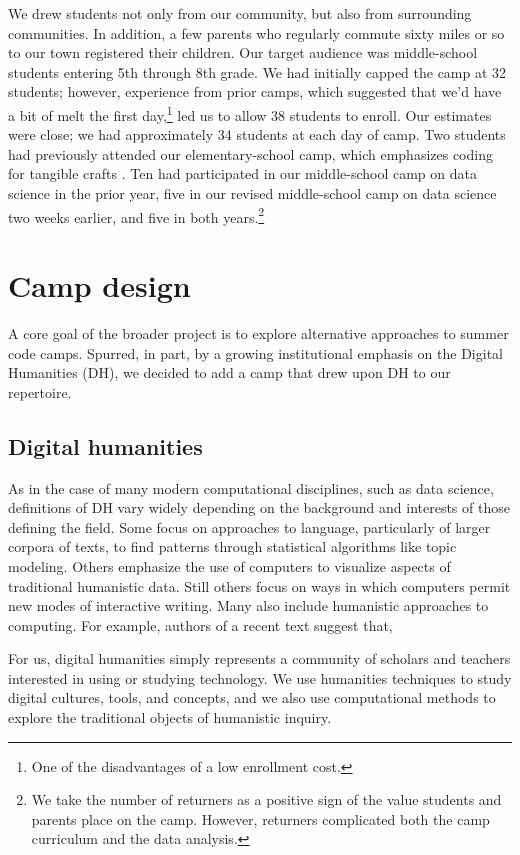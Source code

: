We drew students not only from our community, but also from
surrounding communities.  In addition, a few parents who regularly
commute sixty miles or so to our town registered their children.  Our
target audience was middle-school students entering 5th through 8th grade.
We had initially capped the camp at 32 students; however, experience
from prior camps, which suggested that we'd have a bit of melt the
first day,\footnote{One of the disadvantages of a low enrollment cost.}
led us to allow 38 students to enroll.  Our estimates were close;
we had approximately 34 students at each day of camp.  Two students
had previously attended our elementary-school camp, which emphasizes
coding for tangible crafts \cite{craft-of-code}.  Ten had participated in 
our middle-school camp on data science \cite{dssg-sigcse-2018} in the prior year, five in
our revised middle-school camp on data science \cite{dssg-sigcse-2019} two weeks earlier, and five
in both years.\footnote{We take the number of returners
as a positive sign of the value students and parents place on the camp.
However, returners complicated both the camp curriculum and the
data analysis.}  

\section{Camp design}

A core goal of the broader project is to explore alternative approaches
to summer code camps.  Spurred, in part, by a growing institutional
emphasis on the Digital Humanities (DH), we decided to add a camp that
drew upon DH to our repertoire.

\subsection{Digital humanities}

As in the case of many modern computational disciplines, such as
data science, definitions of DH vary widely
depending on the background and interests of those defining the
field.  Some focus on approaches to language, particularly of larger
corpora of texts, to find patterns through statistical algorithms
like topic modeling.  Others emphasize the use of computers to
visualize aspects of traditional humanistic data.  Still
others focus on ways in which computers permit new modes of interactive
writing.  Many also include humanistic approaches to computing.
For example, authors of a recent text suggest that,
\begin{blockquote}
For us, digital humanities simply represents a community of scholars and teachers interested in using or studying technology. We use humanities techniques to study digital cultures, tools, and concepts, and we also use computational methods to explore the traditional objects of humanistic inquiry. \cite{Battershill2017}
\end{blockquote}

